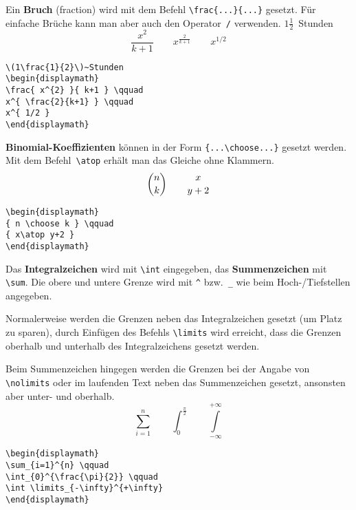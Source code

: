 Ein \textbf{Bruch} (fraction) wird mit dem Befehl
\lstinline|\frac{...}{...}| gesetzt.  Für einfache Brüche kann man
aber auch den Operator~\lstinline|/| verwenden.
\exa
\(1\frac{1}{2}\)~Stunden
\begin{displaymath}
\frac{ x^{2} }{ k+1 } \qquad
x^{ \frac{2}{k+1} } \qquad
x^{ 1/2 }
\end{displaymath}
\exb
\begin{verbatim}
\(1\frac{1}{2}\)~Stunden
\begin{displaymath}
\frac{ x^{2} }{ k+1 } \qquad
x^{ \frac{2}{k+1} } \qquad
x^{ 1/2 }
\end{displaymath}
\end{verbatim}
\exc

\textbf{Binomial-Koeffizienten} können in der Form
\lstinline|{...\choose...}| gesetzt werden.
Mit dem Befehl~\lstinline|\atop| erhält man das Gleiche ohne
Klammern.
\exa
\begin{displaymath}
{ n \choose k } \qquad
{ x\atop y+2 }
\end{displaymath}
\exb
\begin{verbatim}
\begin{displaymath}
{ n \choose k } \qquad
{ x\atop y+2 }
\end{displaymath}
\end{verbatim}
\exc

\medskip

Das \textbf{Integralzeichen} wird mit \lstinline|\int| eingegeben, das
\textbf{Summenzeichen} mit \lstinline|\sum|.
Die obere und untere Grenze wird mit \lstinline|^| bzw.~\lstinline|_| wie
beim \mbox{Hoch-}\slash Tiefstellen angegeben.
 
Normalerweise werden die Grenzen neben das Integralzeichen
gesetzt (um Platz zu sparen), durch Einfügen des Befehls
\lstinline|\limits| wird erreicht, dass die Grenzen oberhalb und
unterhalb des Integralzeichens gesetzt werden.
 
Beim Summenzeichen hingegen werden die Grenzen bei der Angabe von
\lstinline|\nolimits| oder im laufenden Text neben das Summenzeichen
gesetzt, ansonsten aber unter- und oberhalb.
\exa
\begin{displaymath}
\sum_{i=1}^{n} \qquad
\int_{0}^{\frac{\pi}{2}} \qquad
\int \limits_{-\infty}^{+\infty}
\end{displaymath}
\exb
\begin{verbatim}
\begin{displaymath}
\sum_{i=1}^{n} \qquad
\int_{0}^{\frac{\pi}{2}} \qquad
\int \limits_{-\infty}^{+\infty}
\end{displaymath}
\end{verbatim}
\exc
 
